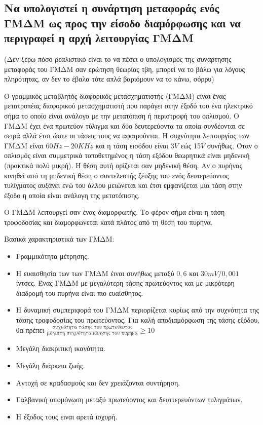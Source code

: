 \documentclass{article}
\begin{document}
\subsection{Να υπολογιστεί η συνάρτηση μεταφοράς ενός ΓΜΔΜ ως προς την είσοδο διαμόρφωσης και να περιγραφεί η αρχή λειτουργίας ΓΜΔΜ}
(Δεν ξέρω πόσο ρεαλιστικό είναι το να πέσει ο υπολογισμός της συνάρτησης μεταφοράς του ΓΜΔΜ σαν ερώτηση θεωρίας τβη, μπορεί να το βάλω για λόγους πληρότητας, αν δεν το έβαλα τότε
απλά βαριόμουν να το κάνω, σόρρυ)

Ο γραμμικός μεταβλητός διαφορικός μετασχηματιστής (ΓΜΔΜ) είναι ένας μετατροπέας διαφορικού μετασχηματιστή που παράγει στην έξοδό του ένα ηλεκτρικό σήμα το οποίο είναι ανάλογο με την 
μετατόπιση ή περιστροφή του οπλισμού. Ο ΓΜΔΜ έχει ένα πρωτεύον τύλιγμα και δύο δευτερεύοντα τα οποία συνδέονται σε σειρά αλλά έτσι ώστε οι τάσεις τους να αφαιρούνται. Η συχνότητα 
λειτουργίας των ΓΜΔΜ είναι $60Hz-20KHz$ και η τάση εισόδου είναι 3$V$ εώς 15$V$ συνήθως. Όταν ο οπλισμός είναι συμμετρικά τοποθετημένος η τάση εξόδου θεωρητικά είναι μηδενική (πρακτικά
πολύ μικρή). Η θέση αυτή ορίζεται σαν μηδενική θέση. Αν ο πυρήνας κινηθεί από τη μηδενική θέση ο συντελεστής ζέυξης του ενός δευτερεύοντος τυλίγματος αυξάνει ενώ του άλλου 
μειώνεται και έτσι εμφανίζεται μια τάση στην έξοδο η οποία είναι ανάλογη της μετατόπισης.

O ΓΜΔΜ λειτουργεί σαν ένας διαμορφωτής. Το φέρον σήμα είναι η τάση τροφοδοσίας και διαμορφωνεται κατά πλάτος από τη θέση του πυρήνα. 

Βασικά χαρακτηριστικά των ΓΜΔΜ: 

\begin{itemize}
    \item Γραμμικότητα μέτρησης.
    \item Η ευαισθησία των των ΓΜΔΜ έιναι συνήθως μεταξύ $0,6$ και $30mV/0,001$ ίντσες. Ένας ΓΜΔΜ με μεγαλύτερη τάσης πρωτεύοντος και με μικρότερη διαδρομή του πυρήνα είναι πιο ευαίσθητος.
    \item Η δυναμική συμπεριφορά του ΓΜΔΜ περιορίζεται κυρίως από την συχνότητα της τάσης τροφοδοσίας του πρωτεύοντος. Για καλή αποδιαμόρφωση της τάσης εξόδου, θα πρέπει
        \newline$\frac{\text{συχνότητα τάσης του πρωτεύοντος}}{\text{μέγιστη συχνότητα κίνησης του πυρήνα}}\geq 10$
    \item Μεγάλη διακριτική ικανότητα.
    \item Μεγάλη διάρκεια ζωής.
    \item Αντοχή σε κραδασμούς και δεν χρειάζονται συντήρηση.
    \item Γαλβανική απομόνωση μεταξύ πρωτεύοντος και δευττερευόντων τυλιγμάτων.
    \item Η έξοδος τους ειναι αρετά ισχυρή.
\end{itemize}
\end{document}
